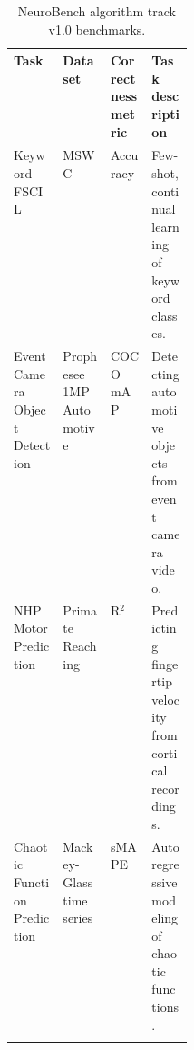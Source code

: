               

\begin{table}[t]
    \centering
    \renewcommand{\arraystretch}{1.3}
    \begin{tabular}{lllm{0.23\linewidth}}
        \thickhline
        Task & Dataset & Correctness metric & Task description  \\\hline
        Keyword FSCIL & MSWC~\cite{mazumder21mswc} & Accuracy & Few-shot, continual learning of keyword classes. \\\hline
        Event Camera Object Detection & Prophesee 1MP Automotive~\cite{Perot2020}  & COCO mAP & Detecting automotive objects from event camera video.  \\\hline
        NHP Motor Prediction & Primate Reaching~\cite{makin-dataset} & R$^2$ & Predicting fingertip velocity from cortical recordings.  \\\hline
        Chaotic Function Prediction & Mackey-Glass time series~\cite{mackey1977oscillation} & sMAPE & Autoregressive modeling of chaotic functions.  \\\thickhline
    \end{tabular}
    \caption{NeuroBench algorithm track v1.0 benchmarks.}
    \label{tab:alg_benchmarks}
\end{table}

